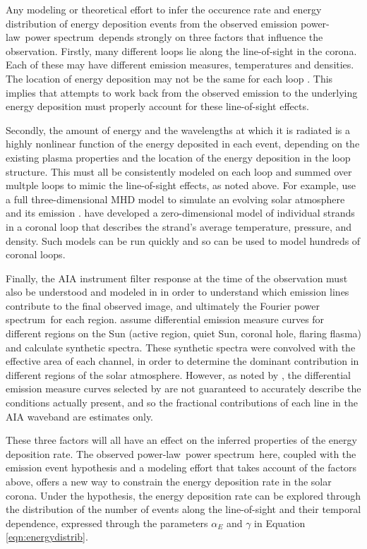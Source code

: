 \documentclass{aastex}
\newcommand{\PS}{power spectrum}
\newcommand{\PL}{power-law}
\newcommand{\Fps}{Fourier \PS}
\begin{document}
Any modeling or theoretical effort to infer the occurence rate and
energy distribution of energy deposition events from the observed
emission \PL\ \PS\ depends strongly on three factors that influence
the observation.  Firstly, many different loops lie along the
line-of-sight in the corona.  Each of these may have different
emission measures, temperatures and densities.  The location of energy
deposition may not be the same for each loop
\citep{2003A&ARv..12....1W, 2006SoPh..234...41K}.  This implies that
attempts to work back from the observed emission to the underlying
energy deposition must properly account for these line-of-sight
effects.

Secondly, the amount of energy and the wavelengths at which it is
radiated is a highly nonlinear function of the energy deposited in
each event, depending on the existing plasma properties and the
location of the energy deposition in the loop structure.  This must
all be consistently modeled on each loop and summed over multple loops
to mimic the line-of-sight effects, as noted above.  For example,
\cite{2011ApJ...743...23M} use a full three-dimensional MHD model to
simulate an evolving solar atmosphere and its emission
\citep{2011AA...531A.154G}.  \cite{2008ApJ...682.1351K,
  0004-637X-752-2-161} have developed a zero-dimensional model of
individual strands in a coronal loop that describes the strand's
average temperature, pressure, and density.  Such models can be run
quickly and so can be used to model hundreds of coronal loops.

Finally, the AIA instrument filter response at the time of the
observation must also be understood and modeled in in order to
understand which emission lines contribute to the final observed
image, and ultimately the \Fps\ for each region.
\cite{2010AA...521A..21O} assume differential emission measure curves
for different regions on the Sun (active region, quiet Sun, coronal
hole, flaring flasma) and calculate synthetic spectra.  These
synthetic spectra were convolved with the effective area of each
channel, in order to determine the dominant contribution in different
regions of the solar atmosphere.  However, as noted by
\cite{2011ApJ...743...23M}, the differential emission measure curves
selected by \cite{2010AA...521A..21O} are not guaranteed to
accurately describe the conditions actually present, and so the
fractional contributions of each line in the AIA waveband are
estimates only.

These three factors will all have an effect on the inferred properties
of the energy deposition rate.  The observed \PL\ \PS\ here, coupled
with the emission event hypothesis and a modeling effort that takes
account of the factors above, offers a new way to constrain the energy
deposition rate in the solar corona.  Under the hypothesis, the energy
deposition rate can be explored through the distribution of the number
of events along the line-of-sight and their temporal dependence,
expressed through the parameters $\alpha_{E}$ and $\gamma$ in Equation
\ref{eqn:energydistrib}.
\end{document}
